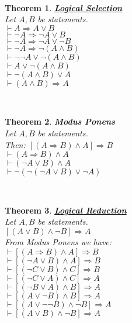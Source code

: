 \documentclass[12pt]{extarticle}
\theoremstyle{plain}
\newtheorem{thm}{Theorem}[section]
\theoremstyle{plain}
\theoremstyle{plain}
\theoremstyle{Definition}
\theoremstyle{Definition}
\theoremstyle{plain}
\theoremstyle{plain}
\newcommand{\cut}[0]{\noindent\framebox[\linewidth]{\rule{\linewidth}{2pt}}\\}
\newcommand{\ddash}{\boxed{\vdash}}
\begin{document}
\cut 
\begin{thm} \underline{\textbf{Logical Selection}} \\
	Let $A,B$ be statements. \\ 
	$\vdash A \Rightarrow A \lor B$ \\ 
	$\vdash \lnot A \Rightarrow \lnot A \lor B$ \\ 
	$\vdash \lnot A \Rightarrow \lnot A \lor \lnot B$ \\ 
	$\vdash \lnot A \Rightarrow \lnot(A \land B)$ \\ 
	$\vdash \lnot \lnot A \lor \lnot (A \land B)$ \\
	$\vdash A \lor \lnot (A \land B)$ \\
	$\vdash \lnot (A \land B) \lor A$ \\
	$\vdash (A \land B) \Rightarrow A$ 
\end{thm}
\cut
\begin{thm} \textbf{Modus Ponens} \\
	Let $A,B$ be statements. \\ 
	Then: $[(A \Rightarrow B) \wedge A] \Rightarrow B$ \\
	$\ddash (A \Rightarrow B) \wedge A$ \\ 
	$\ddash (\lnot A \lor B) \wedge A$ \\ 
	$\ddash \lnot (\lnot (\lnot A \lor B) \lor \lnot A)$ \\
\end{thm}
\cut
\begin{thm} \underline{\textbf{Logical Reduction}} \\ 
	Let $A,B$ be statements. \\ 
	$[(A \lor B)  \land \lnot B] \Rightarrow A$ \\
	From Modus Ponens we have: \\ 
	$\vdash [(A \Rightarrow B) \wedge A] \Rightarrow B$ \\
	$\vdash [(\lnot A \lor B) \wedge A] \Rightarrow B$ \\ 
	$\vdash [(\lnot C \lor B) \wedge C] \Rightarrow B$ \\ 	
	$\vdash [(\lnot C \lor A) \wedge C] \Rightarrow A$ \\ 	
	$\vdash [(\lnot B \lor A) \wedge B] \Rightarrow A$ \\ 	
	$\vdash [(A \lor \lnot B ) \wedge B] \Rightarrow A$ \\
	$\vdash [(A \lor \lnot \lnot B ) \wedge \lnot B] \Rightarrow A$ \\
	$\vdash [(A \lor B ) \wedge \lnot B] \Rightarrow A$ \\
\end{thm}
\end{document}
